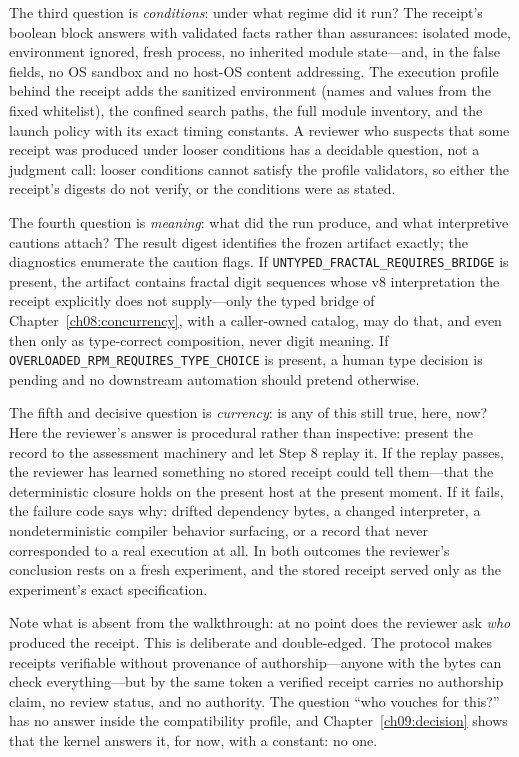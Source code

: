 The third question is \emph{conditions}: under what regime did it run? The receipt's boolean block answers with validated facts rather than assurances: isolated mode, environment ignored, fresh process, no inherited module state---and, in the false fields, no OS sandbox and no host-OS content addressing. The execution profile behind the receipt adds the sanitized environment (names and values from the fixed whitelist), the confined search paths, the full module inventory, and the launch policy with its exact timing constants. A reviewer who suspects that some receipt was produced under looser conditions has a decidable question, not a judgment call: looser conditions cannot satisfy the profile validators, so either the receipt's digests do not verify, or the conditions were as stated.

The fourth question is \emph{meaning}: what did the run produce, and what interpretive cautions attach? The result digest identifies the frozen artifact exactly; the diagnostics enumerate the caution flags. If \texttt{UNTYPED\_FRACTAL\_REQUIRES\_BRIDGE} is present, the artifact contains fractal digit sequences whose v8 interpretation the receipt explicitly does not supply---only the typed bridge of Chapter~\ref{ch08:concurrency}, with a caller-owned catalog, may do that, and even then only as type-correct composition, never digit meaning. If \texttt{OVERLOADED\_RPM\_REQUIRES\_TYPE\_CHOICE} is present, a human type decision is pending and no downstream automation should pretend otherwise.

The fifth and decisive question is \emph{currency}: is any of this still true, here, now? Here the reviewer's answer is procedural rather than inspective: present the record to the assessment machinery and let Step 8 replay it. If the replay passes, the reviewer has learned something no stored receipt could tell them---that the deterministic closure holds on the present host at the present moment. If it fails, the failure code says why: drifted dependency bytes, a changed interpreter, a nondeterministic compiler behavior surfacing, or a record that never corresponded to a real execution at all. In both outcomes the reviewer's conclusion rests on a fresh experiment, and the stored receipt served only as the experiment's exact specification.

\begin{remark}
Note what is absent from the walkthrough: at no point does the reviewer ask \emph{who} produced the receipt. This is deliberate and double-edged. The protocol makes receipts verifiable without provenance of authorship---anyone with the bytes can check everything---but by the same token a verified receipt carries no authorship claim, no review status, and no authority. The question ``who vouches for this?'' has no answer inside the compatibility profile, and Chapter~\ref{ch09:decision} shows that the kernel answers it, for now, with a constant: no one.
\end{remark}

